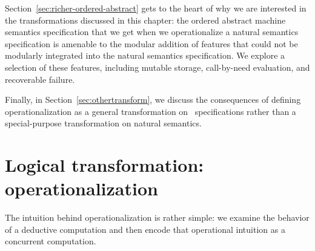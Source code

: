 Section~\ref{sec:richer-ordered-abstract} gets to the heart of why we
are interested in the transformations discussed in this chapter: the
ordered abstract machine semantics specification that we get when we
operationalize a natural semantics specification is amenable to the
modular addition of features that could not be modularly integrated
into the natural semantics specification. We explore a selection of
these features, including mutable storage, call-by-need evaluation,
and recoverable failure.

Finally, in Section~\ref{sec:othertransform}, we discuss the
consequences of defining operationalization as a general
transformation on \sls~specifications rather than a special-purpose
transformation on natural semantics.









\section{Logical transformation: operationalization}
\label{sec:operationalization}

The intuition behind operationalization is rather simple: we examine
the behavior of a deductive computation and then encode that
operational intuition as a concurrent computation. 

